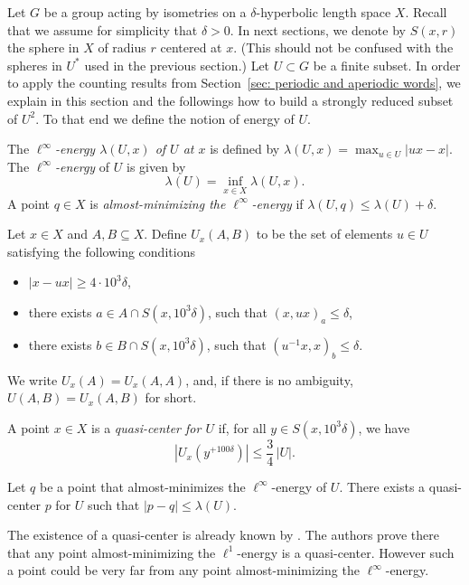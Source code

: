 Let $G$ be a group acting by isometries on a $\delta$-hyperbolic length space $X$.
Recall that we assume for simplicity that $\delta > 0$.
In next sections, we denote by $S(x,r)$ the sphere in $X$ of radius $r$ centered at $x$.
(This should not be confused with the spheres in $U^*$ used in the previous section.)
Let $U\subset G$ be a finite subset.
In order to apply the counting results from Section~\ref{sec: periodic and aperiodic words}, we explain in this section and the followings how to build a strongly reduced subset of $U^2$.
To that end we define the notion of energy of $U$.

\begin{df}
The \emph{$\ell^{\infty}$-energy $\lambda(U,x)$ of $U$ at $x$} is defined by
$\lambda(U,x) = \max_{u\in U} |ux-x|$.
The \emph{$\ell^{\infty}$-energy} of $U$ is given by
\[
\lambda(U)=\inf_{x\in X} \lambda(U,x).
\]
A point $q\in X$ is \emph{almost-minimizing the $ \ell^{\infty}$-energy} if $\lambda(U,q)\leqslant \lambda(U)+\delta$.
\end{df}

\label{sec: quasi-centre}
Let $x \in X$ and $A, B \subseteq X$.
Define $U_x(A,B)$ to be the set of elements $u \in U$ satisfying the following conditions
\begin{itemize}
\item $|x - ux| \geq 4 \cdot 10^3\delta$,
\item there exists $a \in A \cap S(x,10^3\delta)$, such that $(x,ux)_{a}\leqslant \delta$,
\item there exists $b \in B \cap S(x,10^3\delta)$, such that $(u^{-1}x,x)_b\leqslant \delta$.
\end{itemize}
We write $U_x(A)=U_x(A,A)$, and, if there is no ambiguity, $U(A,B)=U_x(A,B)$ for short.

\begin{df}
A point $x\in X$ is a \emph{quasi-center for $U$} if, for all $y\in S(x,10^3\delta)$, we have
\[
\left|U_x\left(y^{+100\delta}\right)\right|\leqslant \frac{3}{4}\, |U|.
\]
\end{df}

\begin{prop}\label{P: quasi-centre}
Let $q$ be a point that almost-minimizes the $\ell^{\infty}$-energy of $U$.
There exists a quasi-center $p$ for $U$ such that $| p - q | \leqslant \lambda (U)$.
\end{prop}
\begin{rem} The existence of a quasi-center is already known by \cite{delzant_product_2020}.
The authors prove there that any point almost-minimizing the $\ell^1$-energy is a quasi-center.
However such a point could be very far from any point almost-minimizing the $\ell^\infty$-energy.
\end{rem}

